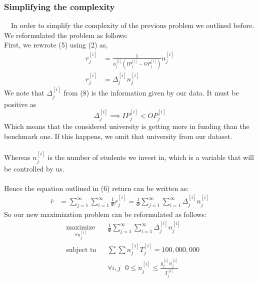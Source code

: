 \documentclass[12pt]{scrartcl}
\begin{document}
	\subsubsection{Simplifying the complexity}
		\ \ In order to simplify the complexity of the previous problem we outlined before. We reformulated the problem as follows:\\
		First, we rewrote (5) using (2) as,
		\begin{equation}
			\begin{aligned}
			r_j^{[i]} &= \frac{1 }{ \phi_j^{[i]} (IP_j^{[i]} - OP_j^{[i]} ) } n_j^{[i]}\\ 
			r_j^{[i]} &= \Delta_j^{[i]} n_j^{[i]}
			\end{aligned}
		\end{equation}	
		We note that $\Delta_j^{[i]}$ from (8) is the information given by our data. It must be positive as $$\Delta_j^{[i]}\implies IP_j^{[i]} < OP_j^{[i]}$$
		Which means that the considered university is getting more in funding than the benchmark one. If this happens, we omit that university from our dataset.\\ 
		\\
		Whereas $n_j^{[i]}$ is the number of students we invest in, which is a variable that will be controlled by us.\\
		\\
		Hence the equation outlined in (6) return can be written as:
		\begin{align}
			\bar{r} &= \sum_{j=1}^\infty\sum_{i=1}^\infty \frac{ 1  }{ \Phi } r_j^{[i]} = \frac{ 1  }{ \Phi }\sum_{j=1}^\infty\sum_{i=1}^\infty \Delta_j^{[i]}n_j^{[i]}
		\end{align}
		So our new maximization problem can be reformulated as follows:
		\begin{equation}
				\begin{aligned}
					& \underset{\forall n_j^{[i]}}{\text{maximize}}
					& &\frac{ 1  }{ \Phi }\sum_{j=1}^\infty\sum_{i=1}^\infty \Delta_j^{[i]}n_j^{[i]}\\
					& \text{subject to}
					& & \sum \sum n_j^{[i]}T_j^{[i]} = 100,000,000\\
					&&& \forall i,j \ \ \ 0\le n_j^{[i]} \le \frac{g_j^{[i]}\phi_j^{[i]}}{T_j^{[i]}}
				\end{aligned}	
		\end{equation}
\end{document}
